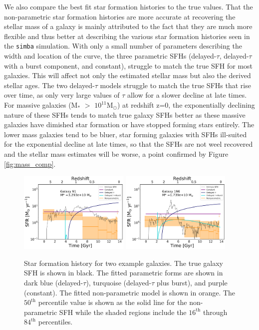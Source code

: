 \documentclass[twocolumn]{aastex62}
\begin{document}
We also compare the best fit star formation histories to the true values. That the non-parametric star formation histories are more accurate at recovering the stellar mass of a galaxy is mainly attributed to the fact that they are much more flexible and thus better at describing the various star formation histories seen in the \texttt{simba} simulation. With only a small number of parameters describing the width and location of the curve, the three parametric SFHs (delayed-$\tau$, delayed-$\tau$ with a burst component, and constant), struggle to match the true SFH for most galaxies. This will affect not only the estimated stellar mass but also the derived stellar ages. The two delayed-$\tau$ models struggle to match the true SFHs that rise over time, as only very large values of $\tau$ allow for a slower decline at late times. For massive galaxies (M$_*$ $>$ $10^{11} \mathrm{M_{\odot}}$) at redshift z=0, the exponentially declining nature of these SFHs tends to match true galaxy SFHs better as these massive galaxies have dimished star formation or have stopped forming stars entirely. The lower mass galaxies tend to be bluer, star forming galaxies with SFHs ill-suited for the exponential decline at late times, so that the SFHs are not weel recovered and the stellar mass estimates will be worse, a point confirmed by Figure \ref{fig:mass_comp}.

\begin{figure}[h]

\centering
\includegraphics[width=0.47\textwidth]{SFH_91png.png}
\includegraphics[width=0.47\textwidth]{SFH_196png.png}

\caption{Star formation history for two example galaxies. The true galaxy SFH is shown in black. The fitted parametric forms are shown in dark blue (delayed-$\tau$), turquoise (delayed-$\tau$ plus burst), and purple (constant). The fitted non-parametric model is shown in orange. The $50^{\mathrm{th}}$ percentile value is shown as the solid line for the non-parametric SFH while the shaded regions include the $16^{\mathrm{th}}$ through $84^{\mathrm{th}}$ percentiles.}
\label{fig:sfh}

\end{figure}
\end{document}
